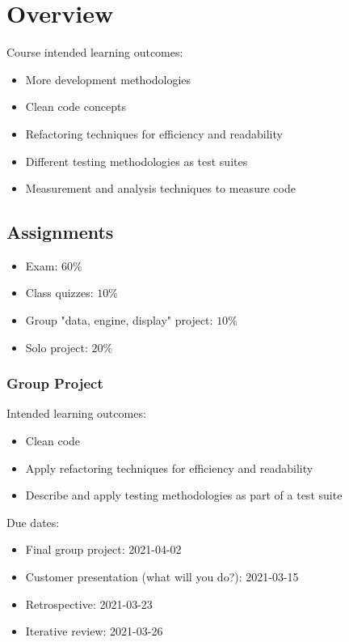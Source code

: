 \section{Overview}\label{sec:overview}

Course intended learning outcomes:
\begin{itemize}
    \item More development methodologies
    \item Clean code concepts
    \item Refactoring techniques for efficiency and readability
    \item Different testing methodologies as test suites
    \item Measurement and analysis techniques to measure code
\end{itemize}

\subsection{Assignments}\label{sub:assignments}

\begin{itemize}
    \item Exam: \(60\%\)
    \item Class quizzes: \(10\%\)
    \item Group "data, engine, display" project: \(10\%\)
    \item Solo project: \(20\%\)
\end{itemize}

\subsubsection{Group Project}\label{ssub:group_project}

Intended learning outcomes:
\begin{itemize}
    \item Clean code
    \item Apply refactoring techniques for efficiency and readability
    \item Describe and apply testing methodologies as part of a test suite
\end{itemize}
%
Due dates:
\begin{itemize}
    \item Final group project: 2021-04-02
    \item Customer presentation (what will you do?): 2021-03-15
    \item Retrospective: 2021-03-23
    \item Iterative review: 2021-03-26
\end{itemize}
